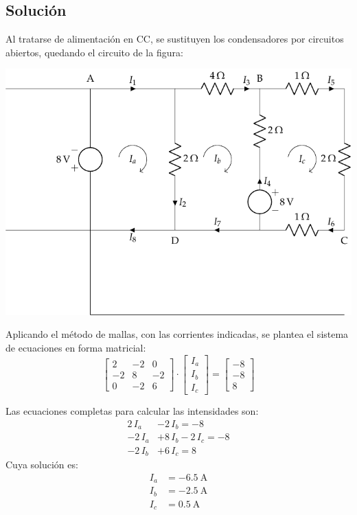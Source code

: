 \subsection*{Solución}
Al tratarse de alimentación en CC, se sustituyen los condensadores por
circuitos abiertos, quedando el circuito de la figura:
\begin{center}
  \includegraphics{figuras/BT1_11_mod.pdf}
\end{center}

Aplicando el método de mallas, con las corrientes indicadas, se
plantea el sistema de ecuaciones en forma matricial:
\begin{equation*}
  \begin{bmatrix}
    2 & -2 & 0 \\
    -2 & 8 & -2 \\
    0 & -2 & 6
  \end{bmatrix} \cdot
  \begin{bmatrix}
    I_a\\
    I_b\\
    I_c
  \end{bmatrix} = %
  \begin{bmatrix}
    -8 \\
    -8\\
    8
  \end{bmatrix}
\end{equation*}

\vspace{2mm}
Las ecuaciones completas para calcular las intensidades son:
\begin{align*}
  2\,I_a&-2\,I_b = -8\\
  -2\,I_a&+8\,I_b-2\,I_c = -8\\
  -2\,I_b&+ 6\,I_c = 8
\end{align*}
Cuya solución es:
\begin{align*}
  I_a&=\qty{-6.5}{\ampere}\\
  I_b&=\qty{-2.5}{\ampere}\\
  I_c&=\qty{0.5}{\ampere}\\
\end{align*}

